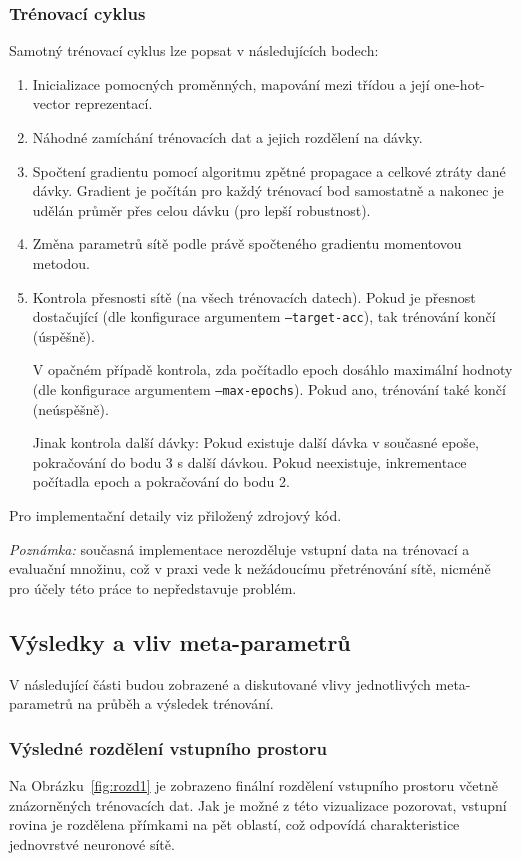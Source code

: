 \subsubsection*{Trénovací cyklus}
Samotný trénovací cyklus lze popsat v následujících bodech:
\begin{enumerate}
	\item Inicializace pomocných proměnných, mapování mezi třídou a její one-hot-vector reprezentací.
	\item Náhodné zamíchání trénovacích dat a jejich rozdělení na dávky.
	\item Spočtení gradientu pomocí algoritmu zpětné propagace a celkové ztráty dané dávky.
	      Gradient je počítán pro každý trénovací bod samostatně a nakonec je udělán průměr přes celou dávku (pro lepší robustnost).
	\item Změna parametrů sítě podle právě spočteného gradientu momentovou metodou.
	\item Kontrola přesnosti sítě (na všech trénovacích datech).
	      Pokud je přesnost dostačující (dle konfigurace argumentem \texttt{--target-acc}), tak trénování končí (úspěšně).

	      V opačném případě kontrola, zda počítadlo epoch dosáhlo maximální hodnoty (dle konfigurace argumentem \texttt{--max-epochs}).
	      Pokud ano, trénování také končí (neúspěšně).

	      Jinak kontrola další dávky: Pokud existuje další dávka v současné epoše, pokračování do bodu 3 s další dávkou.
	      Pokud neexistuje, inkrementace počítadla epoch a pokračování do bodu 2.
\end{enumerate}
Pro implementační detaily viz přiložený zdrojový kód.

\emph{Poznámka:} současná implementace nerozděluje vstupní data na trénovací a evaluační množinu, což v praxi vede k nežádoucímu přetrénování sítě,
nicméně pro účely této práce to nepředstavuje problém.

\subsection{Výsledky a vliv meta-parametrů}
V následující části budou zobrazené a diskutované vlivy jednotlivých meta-parametrů na průběh a výsledek trénování.

\subsubsection{Výsledné rozdělení vstupního prostoru}
Na Obrázku~\ref{fig:rozd1} je zobrazeno finální rozdělení vstupního prostoru včetně znázorněných trénovacích dat.
Jak je možné z této vizualizace pozorovat, vstupní rovina je rozdělena přímkami na pět oblastí, což odpovídá charakteristice jednovrstvé neuronové sítě.


